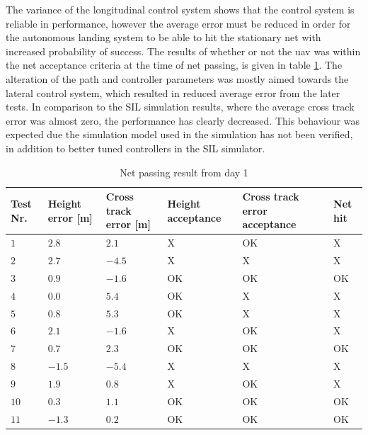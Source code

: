 The variance of the longitudinal control system shows that the control system is reliable in performance, however the average error must be reduced in order for the autonomous landing system to be able to hit the stationary net with increased probability of success. The results of whether or not the \gls{uav} was within the net acceptance criteria at the time of net passing, is given in table \ref{tb:Day1LandingAttempt}. The alteration of the path and controller parameters was mostly aimed towards the lateral control system, which resulted in reduced average error from the later tests. In comparison to the SIL simulation results, where the average cross track error was almost zero, the performance has clearly decreased. This behaviour was expected due the simulation model used in the simulation has not been verified, in addition to better tuned controllers in the SIL simulator.
\begin{table}[H]
\centering
\begin{tabular}{| p{0.5cm} | p{1cm} | p{1cm} | p{3.5cm} | p{3cm} | p{1cm} |}
\hline
\textbf{Test Nr.}	& \textbf{Height error [m]}	& \textbf{Cross track error [m]}& \textbf{Height acceptance}& \textbf{Cross track error acceptance}	& \textbf{Net hit}\\ \hline
$1$				& $2.8$		& $2.1$		& X								& OK									& X					\\ \hline
$2$				& $2.7$		& $-4.5$	& X								& X										& X					\\ \hline
$3$				& $0.9$		& $-1.6$	& OK							& OK									& OK				\\ \hline
$4$				& $0.0$		& $5.4$		& OK							& X										& X					\\ \hline
$5$				& $0.8$		& $5.3$		& OK							& X										& X					\\ \hline
$6$				& $2.1$		& $-1.6$	& X								& OK									& X					\\ \hline
$7$				& $0.7$		& $2.3$		& OK							& OK									& OK				\\ \hline
$8$				& $-1.5$	& $-5.4$	& X								& X										& X					\\ \hline
$9$				& $1.9$		& $0.8$		& X								& OK									& X					\\ \hline
$10$			& $0.3$	& $1.1$		& OK							& OK									& OK				\\ \hline
$11$			& $-1.3$	& $0.2$		& OK							& OK									& OK				\\ \hline
\end{tabular}
\caption{Net passing result from day 1}
\label{tb:Day1LandingAttempt}
\end{table}
